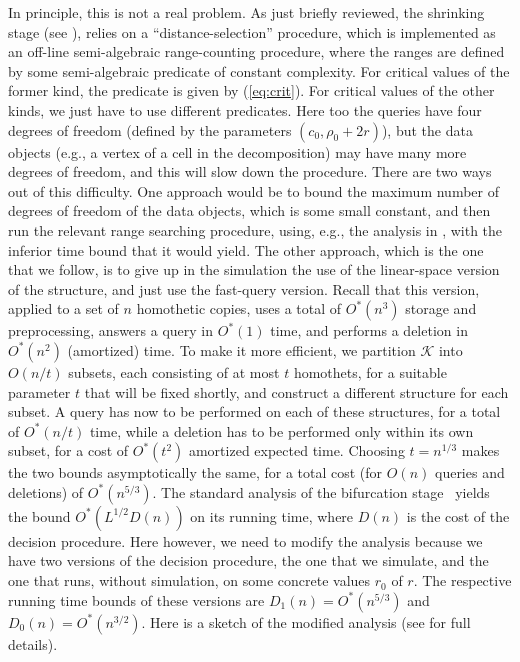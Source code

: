 \documentclass[11pt]{article}
\def\K{\mathcal{K}}
\theoremstyle{definition}
\begin{document}
%
In principle, this is not a real problem. As just briefly reviewed, the shrinking stage 
(see \cite{BFKKS,CH,KKSS}), relies on a ``distance-selection'' procedure, which is
implemented as an off-line semi-algebraic range-counting procedure, where the ranges
are defined by some semi-algebraic predicate of constant complexity. For critical
values of the former kind, the predicate is given by (\ref{eq:crit}). For critical
values of the other kinds, we just have to use different predicates. Here too the
queries have four degrees of freedom (defined by the parameters $(c_0,\rho_0+2r)$), 
but the data objects (e.g., a vertex of a cell in the decomposition) may have many more 
degrees of freedom, and this will slow down the procedure.
%
There are two ways out of this difficulty. One approach would be to bound the maximum 
number of degrees of freedom of the data objects, which is some small constant, and then run the relevant range 
searching procedure, using, e.g., the analysis in \cite[Appendix]{AAEKS}, with the
inferior time bound that it would yield. The other approach, which is the one that we follow,
is to give up in the simulation the use of the linear-space version of the structure,
and just use the fast-query version.
%
Recall that this version, applied to a set of $n$ homothetic copies, uses a total of $O^*(n^3)$
storage and preprocessing, answers a query in $O^*(1)$ time, and performs a deletion in
$O^*(n^2)$ (amortized) time. To make it more efficient, we partition $\K$ into $O(n/t)$ subsets, 
each consisting of at most $t$ homothets, for a suitable parameter $t$ that will be fixed shortly,
and construct a different structure for each subset. 
A query has now to be performed on each of these structures, for a total of $O^*(n/t)$ time,
while a deletion has to be performed only within its own subset, for a cost of $O^*(t^2)$
amortized expected time. Choosing $t=n^{1/3}$ makes the two bounds asymptotically the same, 
for a total cost (for $O(n)$ queries and deletions) of $O^*(n^{5/3})$.
%
The standard analysis of the bifurcation stage~\cite{BFKKS} yields the bound $O^*(L^{1/2}D(n))$ on its
running time, where $D(n)$ is the cost of the decision procedure. Here however, we need to
modify the analysis because we have two versions of the decision procedure, the one that we 
simulate, and the one that runs, without simulation, on some concrete values $r_0$ of $r$.
The respective running time bounds of these versions are $D_1(n) = O^*(n^{5/3})$ and
$D_0(n) = O^*(n^{3/2})$.
%
Here is a sketch of the modified analysis (see \cite{BFKKS,KKSS} for full details). 
\end{document}
